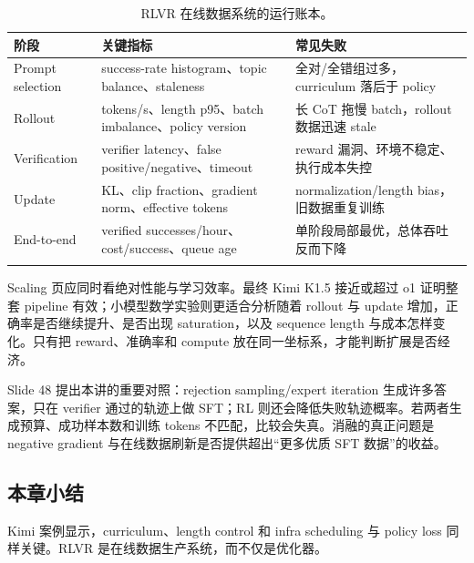 \begin{longtable}{L{0.17\textwidth}L{0.35\textwidth}L{0.38\textwidth}}
\toprule
阶段 & 关键指标 & 常见失败 \\
\midrule
Prompt selection & success-rate histogram、topic balance、staleness & 全对/全错组过多，curriculum 落后于 policy \\
Rollout & tokens/s、length p95、batch imbalance、policy version & 长 CoT 拖慢 batch，rollout 数据迅速 stale \\
Verification & verifier latency、false positive/negative、timeout & reward 漏洞、环境不稳定、执行成本失控 \\
Update & KL、clip fraction、gradient norm、effective tokens & normalization/length bias，旧数据重复训练 \\
End-to-end & verified successes/hour、cost/success、queue age & 单阶段局部最优，总体吞吐反而下降 \\
\bottomrule
\caption{RLVR 在线数据系统的运行账本。}
\end{longtable}


Scaling 页应同时看绝对性能与学习效率。最终 Kimi K1.5 接近或超过 o1 证明整套 pipeline 有效；小模型数学实验则更适合分析随着 rollout 与 update 增加，正确率是否继续提升、是否出现 saturation，以及 sequence length 与成本怎样变化。只有把 reward、准确率和 compute 放在同一坐标系，才能判断扩展是否经济。


Slide 48 提出本讲的重要对照：rejection sampling/expert iteration 生成许多答案，只在 verifier 通过的轨迹上做 SFT；RL 则还会降低失败轨迹概率。若两者生成预算、成功样本数和训练 tokens 不匹配，比较会失真。消融的真正问题是 negative gradient 与在线数据刷新是否提供超出“更多优质 SFT 数据”的收益。

\subsection{本章小结}

Kimi 案例显示，curriculum、length control 和 infra scheduling 与 policy loss 同样关键。RLVR 是在线数据生产系统，而不仅是优化器。

